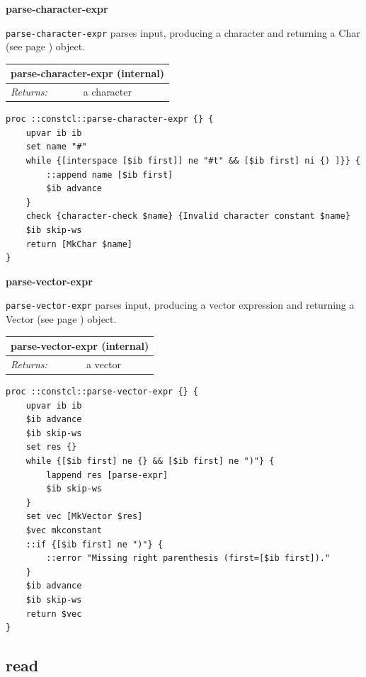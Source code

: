 \documentclass[twoside,9pt]{report}
\begin{document}
\textbf{parse-character-expr}


\texttt{parse-character-expr} parses input, producing a character and returning a Char (see page \pageref{characters}) object.

\begin{tabular}{ |l l| }
\hline
\multicolumn{2}{|l|}{parse-character-expr (internal)} \\
\hline
\textit{Returns:} & a character \\
\hline
\end{tabular}

\noindent\makebox[\linewidth]{\rule{\linewidth}{0.4pt}}
\begin{lstlisting}
proc ::constcl::parse-character-expr {} {
    upvar ib ib
    set name "#"
    while {[interspace [$ib first]] ne "#t" && [$ib first] ni {) ]}} {
        ::append name [$ib first]
        $ib advance
    }
    check {character-check $name} {Invalid character constant $name}
    $ib skip-ws
    return [MkChar $name]
}
\end{lstlisting}
\noindent\makebox[\linewidth]{\rule{\linewidth}{0.4pt}}

\textbf{parse-vector-expr}


\texttt{parse-vector-expr} parses input, producing a vector expression and returning a Vector (see page \pageref{vectors}) object.

\begin{tabular}{ |l l| }
\hline
\multicolumn{2}{|l|}{parse-vector-expr (internal)} \\
\hline
\textit{Returns:} & a vector \\
\hline
\end{tabular}

\noindent\makebox[\linewidth]{\rule{\linewidth}{0.4pt}}
\begin{lstlisting}
proc ::constcl::parse-vector-expr {} {
    upvar ib ib
    $ib advance
    $ib skip-ws
    set res {}
    while {[$ib first] ne {} && [$ib first] ne ")"} {
        lappend res [parse-expr]
        $ib skip-ws
    }
    set vec [MkVector $res]
    $vec mkconstant
    ::if {[$ib first] ne ")"} {
        ::error "Missing right parenthesis (first=[$ib first])."
    }
    $ib advance
    $ib skip-ws
    return $vec
}
\end{lstlisting}
\noindent\makebox[\linewidth]{\rule{\linewidth}{0.4pt}}
\subsection{read}
\label{read}
\end{document}
